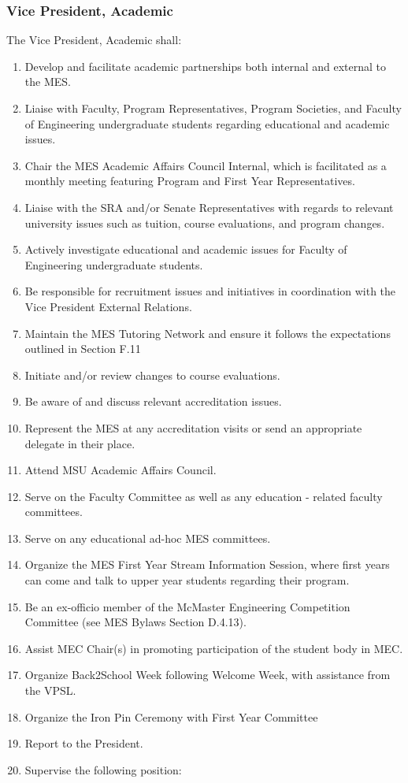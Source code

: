 \hypertarget{vice-president-academic}{%
 \subsubsection{Vice President,
  Academic}
 \label{vice-president-academic}}
The Vice President, Academic shall:

\begin{enumerate}
 \item
  Develop and facilitate academic partnerships both internal and
  external to the MES.
 \item
  Liaise with Faculty, Program Representatives, Program Societies, and
  Faculty of Engineering undergraduate students regarding educational
  and academic issues.
 \item
  Chair the MES Academic Affairs Council Internal, which is facilitated
  as a monthly meeting featuring Program and First Year Representatives.
 \item
  Liaise with the SRA and/or Senate Representatives with regards to
  relevant university issues such as tuition, course evaluations, and
  program changes.
 \item
  Actively investigate educational and academic issues for Faculty of
  Engineering undergraduate students.
 \item
  Be responsible for recruitment issues and initiatives in coordination
  with the Vice President External Relations.
 \item
  Maintain the MES Tutoring Network and ensure it follows the
  expectations outlined in Section F.11
 \item
  Initiate and/or review changes to course evaluations.
 \item
  Be aware of and discuss relevant accreditation issues.
 \item
  Represent the MES at any accreditation visits or send an appropriate
  delegate in their place.
 \item
  Attend MSU Academic Affairs Council.
 \item
  Serve on the Faculty Committee as well as any education - related
  faculty committees.
 \item
  Serve on any educational ad-hoc MES committees.
 \item
  Organize the MES First Year Stream Information Session, where first
  years can come and talk to upper year students regarding their
  program.
 \item
  Be an ex-officio member of the McMaster Engineering Competition
  Committee (see MES Bylaws Section D.4.13).
 \item
  Assist MEC Chair(s) in promoting participation of the student body in
  MEC.
 \item
  Organize Back2School Week following Welcome Week, with assistance from
  the VPSL.
 \item
  Organize the Iron Pin Ceremony with First Year Committee
 \item
  Report to the President.
 \item
  Supervise the following position:


\end{enumerate}
